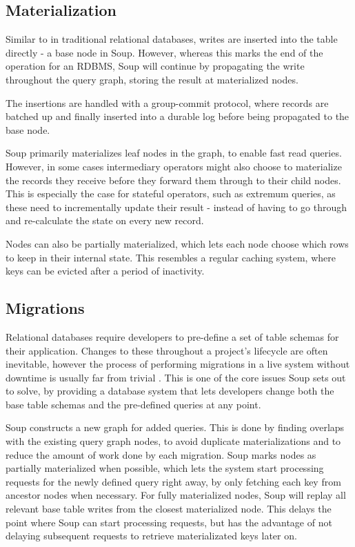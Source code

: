 \documentclass[b5paper]{report}
\begin{document}
\subsection{Materialization}
Similar to in traditional relational databases, writes are inserted into the
table directly - a base node in Soup. However, whereas this marks the
end of the operation for an RDBMS, Soup will continue by propagating the write
throughout the query graph, storing the result at materialized nodes.

The insertions are handled with a group-commit protocol, where records are
batched up and finally inserted into a durable log before being propagated to
the base node.

Soup primarily materializes leaf nodes in the graph, to enable fast read
queries. However, in some cases intermediary operators might also choose to
materialize the records they receive before they forward them through to their
child nodes. This is especially the case for stateful operators, such as
extremum queries, as these need to incrementally update their result - instead
of having to go through and re-calculate the state on every new record.

Nodes can also be partially materialized, which lets each node choose which rows
to keep in their internal state. This resembles a regular caching system, where
keys can be evicted after a period of inactivity.

\subsection{Migrations}
Relational databases require developers to pre-define a set of table schemas for
their application. Changes to these throughout a project's lifecycle are often
inevitable, however the process of performing migrations in a live
system without downtime is usually far from trivial \cite{stripe}. This is one
of the core issues Soup sets out to solve, by providing a database system that
lets developers change both the base table schemas and the pre-defined queries
at any point.

Soup constructs a new graph for added queries. This is done by finding overlaps
with the existing query graph nodes, to avoid duplicate materializations and
to reduce the amount of work done by each migration. Soup marks nodes as
partially materialized when possible, which lets the system start processing
requests for the newly defined query right away, by only fetching each key from
ancestor nodes when necessary. For fully materialized nodes, Soup will replay
all relevant base table writes from the closest materialized node. This
delays the point where Soup can start processing requests, but has the advantage
of not delaying subsequent requests to retrieve materializated keys later on.
\end{document}
